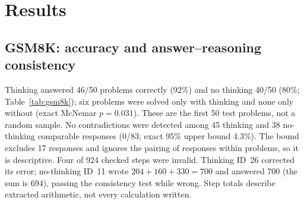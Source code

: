\section{Results}\label{sec:results}

\subsection{GSM8K: accuracy and answer--reasoning consistency}\label{sec:res-gsm8k}
Thinking answered 46/50 problems correctly (92\%) and no thinking 40/50 (80\%;
Table~\ref{tab:gsm8k}); six problems were solved only with thinking and none only
without (exact McNemar $p=0.031$). These are the first 50 test problems, not a random
sample. No contradictions were detected among 45 thinking and 38 no-thinking comparable
responses (0/83; exact 95\% upper bound 4.3\%). The bound excludes 17 responses and
ignores the pairing of responses within problems, so it is descriptive. Four of 924
checked steps were invalid. Thinking ID~26 corrected its error; no-thinking ID~11 wrote
$204+160+330=700$ and answered 700 (the sum is 694), passing the consistency test while
wrong. Step totals describe extracted arithmetic, not every calculation written.

